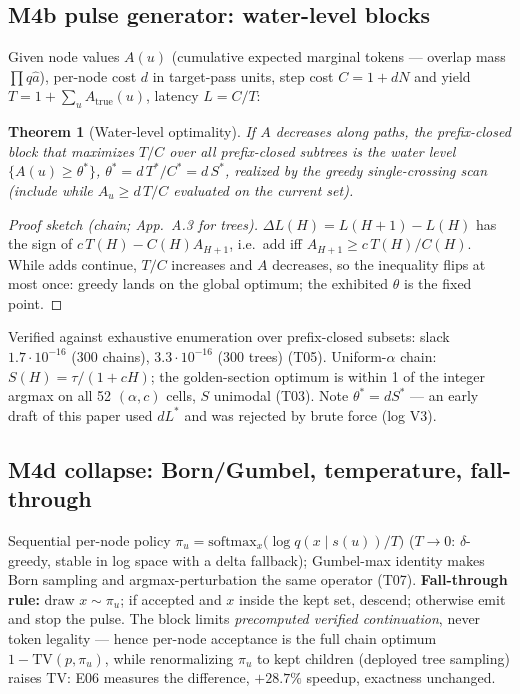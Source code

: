 \documentclass[11pt,a4paper]{article}
\newtheorem{theorem}{Theorem}[section]
\theoremstyle{definition}
\begin{document}
\subsection{M4b pulse generator: water-level blocks}
\label{sec:pulse}
Given node values $A(u)$ (cumulative expected marginal tokens --- overlap
mass $\prod q\hat a$), per-node cost $d$ in target-pass units,
step cost $C=1+dN$ and yield $T=1+\sum_{u}A_{\text{true}}(u)$, latency
$L=C/T$:
\begin{theorem}[Water-level optimality]
\label{thm:water}
If $A$ decreases along paths, the prefix-closed block that maximizes $T/C$
over \emph{all} prefix-closed subtrees is the water level
$\{A(u)\ge\theta^\ast\}$, $\theta^\ast=d\,T^\ast/C^\ast=d\,S^\ast$, realized
by the greedy single-crossing scan (include while
$A_u \ge d\,T/C$ evaluated on the current set).
\end{theorem}
\begin{proof}[Proof sketch (chain; App.~A.3 for trees)]
$\Delta L(H)=L(H{+}1)-L(H)$ has the sign of $c\,T(H)-C(H)A_{H+1}$, i.e.\
add iff $A_{H+1}\ge c\,T(H)/C(H)$. While adds continue, $T/C$ increases and
$A$ decreases, so the inequality flips at most once: greedy lands on the
global optimum; the exhibited $\theta$ is the fixed point.
\end{proof}
Verified against exhaustive enumeration over prefix-closed subsets:
slack $1.7\cdot10^{-16}$ (300 chains), $3.3\cdot10^{-16}$ (300 trees) (T05).
Uniform-$\alpha$ chain: $S(H)=\tau/(1+cH)$; the golden-section optimum is
within 1 of the integer argmax on all 52 $(\alpha,c)$ cells, $S$ unimodal
(T03). Note $\theta^\ast = dS^\ast$ --- an early draft of this paper used
$dL^\ast$ and was rejected by brute force (log V3).

\subsection{M4d collapse: Born/Gumbel, temperature, fall-through}
\label{sec:collapse}
Sequential per-node policy
$\pi_u=\mathrm{softmax}_x\big(\log q(x\mid s(u))/T\big)$ ($T\to0$:
$\delta$-greedy, stable in log space with a delta fallback); Gumbel-max
identity makes Born sampling and argmax-perturbation the same operator (T07).
\textbf{Fall-through rule:} draw $x\sim\pi_u$; if accepted and $x$ inside the
kept set, descend; otherwise emit and stop the pulse. The block limits
\emph{precomputed verified continuation}, never token legality --- hence
per-node acceptance is the full chain optimum $1-\mathrm{TV}(p,\pi_u)$, while
renormalizing $\pi_u$ to kept children (deployed tree sampling) raises TV:
E06 measures the difference, $+28.7\%$ speedup, exactness unchanged.
\end{document}
